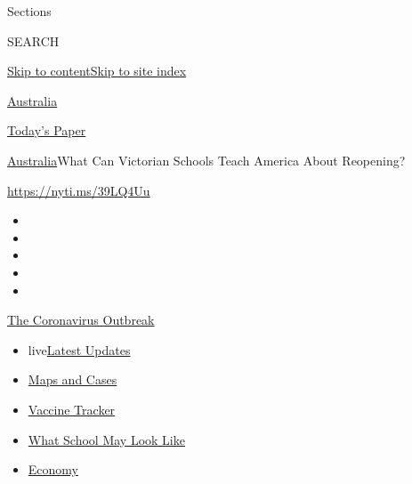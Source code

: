 Sections

SEARCH

\protect\hyperlink{site-content}{Skip to
content}\protect\hyperlink{site-index}{Skip to site index}

\href{https://www.nytimes3xbfgragh.onion/section/world/australia}{Australia}

\href{https://myaccount.nytimes3xbfgragh.onion/auth/login?response_type=cookie\&client_id=vi}{}

\href{https://www.nytimes3xbfgragh.onion/section/todayspaper}{Today's
Paper}

\href{/section/world/australia}{Australia}\textbar{}What Can Victorian
Schools Teach America About Reopening?

\url{https://nyti.ms/39LQ4Uu}

\begin{itemize}
\item
\item
\item
\item
\item
\end{itemize}

\href{https://www.nytimes3xbfgragh.onion/news-event/coronavirus?action=click\&pgtype=Article\&state=default\&region=TOP_BANNER\&context=storylines_menu}{The
Coronavirus Outbreak}

\begin{itemize}
\tightlist
\item
  live\href{https://www.nytimes3xbfgragh.onion/2020/08/01/world/coronavirus-covid-19.html?action=click\&pgtype=Article\&state=default\&region=TOP_BANNER\&context=storylines_menu}{Latest
  Updates}
\item
  \href{https://www.nytimes3xbfgragh.onion/interactive/2020/us/coronavirus-us-cases.html?action=click\&pgtype=Article\&state=default\&region=TOP_BANNER\&context=storylines_menu}{Maps
  and Cases}
\item
  \href{https://www.nytimes3xbfgragh.onion/interactive/2020/science/coronavirus-vaccine-tracker.html?action=click\&pgtype=Article\&state=default\&region=TOP_BANNER\&context=storylines_menu}{Vaccine
  Tracker}
\item
  \href{https://www.nytimes3xbfgragh.onion/interactive/2020/07/29/us/schools-reopening-coronavirus.html?action=click\&pgtype=Article\&state=default\&region=TOP_BANNER\&context=storylines_menu}{What
  School May Look Like}
\item
  \href{https://www.nytimes3xbfgragh.onion/live/2020/07/31/business/stock-market-today-coronavirus?action=click\&pgtype=Article\&state=default\&region=TOP_BANNER\&context=storylines_menu}{Economy}
\end{itemize}

